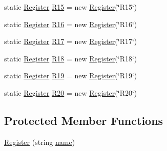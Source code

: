\begin{DoxyCompactItemize}
\item 
static \hyperlink{class_c_p_u___o_s___simulator_1_1_c_p_u_1_1_register}{Register} \hyperlink{class_c_p_u___o_s___simulator_1_1_c_p_u_1_1_register_a643aa109f6aea2e44a92aca9cd62b2df}{R15} = new \hyperlink{class_c_p_u___o_s___simulator_1_1_c_p_u_1_1_register}{Register}(\char`\"{}R15\char`\"{})
\item 
static \hyperlink{class_c_p_u___o_s___simulator_1_1_c_p_u_1_1_register}{Register} \hyperlink{class_c_p_u___o_s___simulator_1_1_c_p_u_1_1_register_ac008605898ab29a4ecd071f25f9e2d50}{R16} = new \hyperlink{class_c_p_u___o_s___simulator_1_1_c_p_u_1_1_register}{Register}(\char`\"{}R16\char`\"{})
\item 
static \hyperlink{class_c_p_u___o_s___simulator_1_1_c_p_u_1_1_register}{Register} \hyperlink{class_c_p_u___o_s___simulator_1_1_c_p_u_1_1_register_add014a0021f9e8115728d7b95a398bda}{R17} = new \hyperlink{class_c_p_u___o_s___simulator_1_1_c_p_u_1_1_register}{Register}(\char`\"{}R17\char`\"{})
\item 
static \hyperlink{class_c_p_u___o_s___simulator_1_1_c_p_u_1_1_register}{Register} \hyperlink{class_c_p_u___o_s___simulator_1_1_c_p_u_1_1_register_aac05b1dce0cbfda874ca7c1783485095}{R18} = new \hyperlink{class_c_p_u___o_s___simulator_1_1_c_p_u_1_1_register}{Register}(\char`\"{}R18\char`\"{})
\item 
static \hyperlink{class_c_p_u___o_s___simulator_1_1_c_p_u_1_1_register}{Register} \hyperlink{class_c_p_u___o_s___simulator_1_1_c_p_u_1_1_register_a1d5394eb0e63d28e96decccbdbc2ec2c}{R19} = new \hyperlink{class_c_p_u___o_s___simulator_1_1_c_p_u_1_1_register}{Register}(\char`\"{}R19\char`\"{})
\item 
static \hyperlink{class_c_p_u___o_s___simulator_1_1_c_p_u_1_1_register}{Register} \hyperlink{class_c_p_u___o_s___simulator_1_1_c_p_u_1_1_register_a6fe52ef881281bbfdc42aa7f4cc68f4d}{R20} = new \hyperlink{class_c_p_u___o_s___simulator_1_1_c_p_u_1_1_register}{Register}(\char`\"{}R20\char`\"{})
\end{DoxyCompactItemize}
\subsection*{Protected Member Functions}
\begin{DoxyCompactItemize}
\item 
\hyperlink{class_c_p_u___o_s___simulator_1_1_c_p_u_1_1_register_a17e76aef3bd00389ac1473b4edda8855}{Register} (string \hyperlink{class_c_p_u___o_s___simulator_1_1_c_p_u_1_1_register_a1d9405f19dc212f0ff3d3307469451db}{name})
\end{DoxyCompactItemize}
